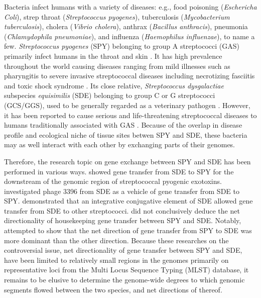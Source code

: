 \documentclass[english]{article}
\begin{document}
Bacteria infect humans with a variety of diseases: e.g., food poisoning
(\textit{Eschericha Coli}), strep throat (\textit{Streptococcus pyogenes}),
tuberculosis (\textit{Mycobacterium tuberculosis}), cholera (\textit{Vibrio
cholera}), anthrax (\textit{Bacillus anthracis}), pneumonia
(\textit{Chlamydophila pneumoniae}), and influenza (\textit{Haemophilus
influenzae}), to name a few.  \textit{Streptococcus pyogenes} (SPY) belonging to
group A streptococci (GAS) primarily infect humans in the throat and skin
\citep{Broyles2009}. It has high prevalence throughout the world causing
diseases ranging from mild illnesses such as pharyngitis to severe invasive
streptococcal diseases including necrotizing fasciitis and toxic shock syndrome
\citep{Cunningham2000a}.  Its close relative, \textit{Streptococcus
dysgalactiae} subspecies \textit{equisimilis} (SDE) belonging to group C or G
streptococci (GCS/GGS), used to be generally regarded as a veterinary pathogen
\citep{Vandamme1996}. However, it has been reported to cause serious and
life-threatening streptococcal diseases to humans traditionally associated with
GAS \citep[e.g.,][]{Brandt2009}.  Because of the overlap in disease profile and
ecological niche of tissue sites betwen SPY and SDE, these bacteria may as
well interact with each other by exchanging parts of their genomes.  

Therefore, the research topic on gene exchange between SPY and SDE has been
performed in various ways. \citet{Sachse2002} showed gene transfer from SDE to
SPY for the downstream of the genomic region of streptococcal pyogenic
exotoxins. \citet{Davies2007} investigated phage 3396 from SDE as a vehicle of
gene transfer from SDE to SPY. \citet{Davies2009} demonstrated that an
integrative conjugative element of SDE allowed gene transfer from SDE to other
streptococci.  \citet{Ahmad2009} did not conclusively deduce the net
directionality of housekeeping gene transfer between SPY and SDE.  Notably,
\citet{Kalia2001} attempted to show that the net direction of gene transfer from
SPY to SDE was more dominant than the other direction.  Because these researches
on the controversial issue, net directionality of gene transfer between SPY and
SDE, have been limited to relatively small regions in the genomes primarily on
representative loci from the Multi Locus Sequence Typing (MLST) database, it
remains to be elusive to determine the genome-wide degrees to which genomic
segments flowed between the two species, and net directions of thereof.
\end{document}
